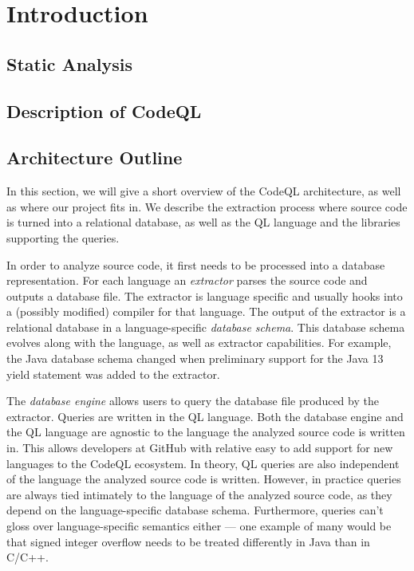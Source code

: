 \section{Introduction}
\subsection{Static Analysis}
\subsection{Description of CodeQL}

\subsection{Architecture Outline}
In this section, we will give a short overview of the CodeQL architecture, as well as where our
project fits in. We describe the extraction process where source code is turned into a relational database,
as well as the QL language and the libraries supporting the queries.

In order to analyze source code, it first needs to be processed into a database representation.
For each language an \emph{extractor} parses the source code and outputs a database file.
The extractor is language specific and usually hooks into a (possibly modified) compiler for that language.
The output of the extractor is a relational database in a language-specific \emph{database schema}.
This database schema evolves along with the language, as well as extractor capabilities.
For example, the Java database schema changed when preliminary support for the Java 13 yield statement was
added to the extractor.

The \emph{database engine} allows users to query the database file produced by the extractor.
Queries are written in the QL language.
Both the database engine and the QL language are agnostic to the language the analyzed source code 
is written in.
This allows developers at GitHub with relative easy to add support for new languages to the CodeQL ecosystem.
In theory, QL queries are also independent of the language the analyzed source code is written.
However, in practice queries are always tied intimately to the language of the analyzed source code,
as they depend on the language-specific database schema.
Furthermore, queries can't gloss over language-specific semantics either {---} one example of many would be
that signed integer overflow needs to be treated differently in Java than in C/C++.

